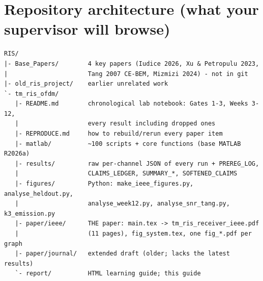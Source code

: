 \documentclass[11pt,a4paper]{article}
\begin{document}
\section{Repository architecture (what your supervisor will browse)}
{\small
\begin{verbatim}
RIS/
|- Base_Papers/        4 key papers (Iudice 2026, Xu & Petropulu 2023,
|                      Tang 2007 CE-BEM, Mizmizi 2024) - not in git
|- old_ris_project/    earlier unrelated work
`- tm_ris_ofdm/
   |- README.md        chronological lab notebook: Gates 1-3, Weeks 3-12,
   |                   every result including dropped ones
   |- REPRODUCE.md     how to rebuild/rerun every paper item
   |- matlab/          ~100 scripts + core functions (base MATLAB R2026a)
   |- results/         raw per-channel JSON of every run + PREREG_LOG,
   |                   CLAIMS_LEDGER, SUMMARY_*, SOFTENED_CLAIMS
   |- figures/         Python: make_ieee_figures.py, analyse_heldout.py,
   |                   analyse_week12.py, analyse_snr_tang.py, k3_emission.py
   |- paper/ieee/      THE paper: main.tex -> tm_ris_receiver_ieee.pdf
   |                   (11 pages), fig_system.tex, one fig_*.pdf per graph
   |- paper/journal/   extended draft (older; lacks the latest results)
   `- report/          HTML learning guide; this guide
\end{verbatim}}
\end{document}
